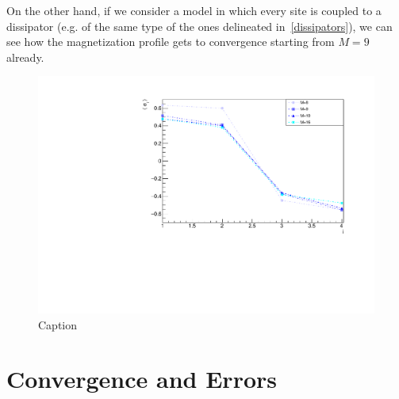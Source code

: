 On the other hand, if we consider a model in which every site is coupled to a dissipator (e.g. of the same type of the ones delineated in~\ref{dissipators}), we can see how the magnetization profile gets to convergence starting from $M = 9$ already.


\begin{figure}[H]
    \centering
    \includegraphics[scale=0.7]{Figures/4sites/4sites_totalDissipators.pdf}
    \caption{Caption}
    \label{fig:4sites_totalDissipators}
\end{figure}





\section{Convergence and Errors}

